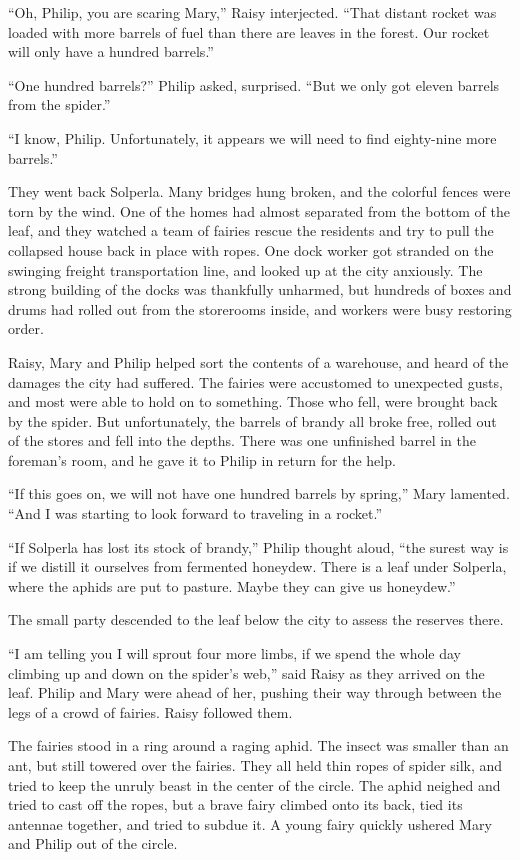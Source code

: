 \documentclass[10pt, draft]{memoir}
\begin{document}
``Oh, Philip, you are scaring Mary,'' Raisy interjected. ``That distant rocket
was loaded with more barrels of fuel than there are leaves in the forest. Our
rocket will only have a hundred barrels.''

``One hundred barrels?'' Philip asked, surprised. ``But we only got eleven
barrels from the spider.''

``I know, Philip. Unfortunately, it appears we will need to find eighty-nine
more barrels.''

They went back Solperla. Many bridges hung broken, and the colorful fences were
torn by the wind. One of the homes had almost separated from the bottom of the
leaf, and they watched a team of fairies rescue the residents and try to pull
the collapsed house back in place with ropes. One dock worker got stranded on
the swinging freight transportation line, and looked up at the city anxiously.
The strong building of the docks was thankfully unharmed, but hundreds of boxes
and drums had rolled out from the storerooms inside, and workers were busy
restoring order.

Raisy, Mary and Philip helped sort the contents of a warehouse, and heard of
the damages the city had suffered. The fairies were accustomed to unexpected
gusts, and most were able to hold on to something. Those who fell, were brought
back by the spider. But unfortunately, the barrels of brandy all broke free,
rolled out of the stores and fell into the depths. There was one unfinished
barrel in the foreman's room, and he gave it to Philip in return for the help.

``If this goes on, we will not have one hundred barrels by spring,'' Mary
lamented. ``And I was starting to look forward to traveling in a rocket.''

``If Solperla has lost its stock of brandy,'' Philip thought aloud, ``the
surest way is if we distill it ourselves from fermented honeydew. There is a
leaf under Solperla, where the aphids are put to pasture. Maybe they can give
us honeydew.''

The small party descended to the leaf below the city to assess the reserves
there.

``I am telling you I will sprout four more limbs, if we spend the whole day
climbing up and down on the spider's web,'' said Raisy as they arrived on the
leaf. Philip and Mary were ahead of her, pushing their way through between the
legs of a crowd of fairies. Raisy followed them.

The fairies stood in a ring around a raging aphid. The insect was smaller than
an ant, but still towered over the fairies. They all held thin ropes of spider
silk, and tried to keep the unruly beast in the center of the circle. The aphid
neighed and tried to cast off the ropes, but a brave fairy climbed onto its
back, tied its antennae together, and tried to subdue it. A young fairy quickly
ushered Mary and Philip out of the circle.
\end{document}
